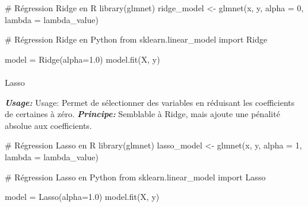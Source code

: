 \documentclass[
  letterpaper,
  DIV=11,
  numbers=noendperiod]{scrartcl}
\makeatletter
\let\oldparagraph\paragraph
\renewcommand{\paragraph}{
    \@ifstar
      \xxxParagraphStar
      \xxxParagraphNoStar
  }
\newcommand{\xxxParagraphStar}[1]{\oldparagraph*{#1}\mbox{}}
\newcommand{\xxxParagraphNoStar}[1]{\oldparagraph{#1}\mbox{}}
\newenvironment{Shaded}{\begin{snugshade}}{\end{snugshade}}
\newcommand{\AttributeTok}[1]{\textcolor[rgb]{0.40,0.45,0.13}{#1}}
\newcommand{\CommentTok}[1]{\textcolor[rgb]{0.37,0.37,0.37}{#1}}
\newcommand{\DecValTok}[1]{\textcolor[rgb]{0.68,0.00,0.00}{#1}}
\newcommand{\FloatTok}[1]{\textcolor[rgb]{0.68,0.00,0.00}{#1}}
\newcommand{\FunctionTok}[1]{\textcolor[rgb]{0.28,0.35,0.67}{#1}}
\newcommand{\NormalTok}[1]{\textcolor[rgb]{0.00,0.23,0.31}{#1}}
\newcommand{\OtherTok}[1]{\textcolor[rgb]{0.00,0.23,0.31}{#1}}
\makeatother
\begin{document}
\begin{Shaded}
\begin{Highlighting}[]
\CommentTok{\# Régression Ridge en R}
\FunctionTok{library}\NormalTok{(glmnet)}
\NormalTok{ridge\_model }\OtherTok{\textless{}{-}} \FunctionTok{glmnet}\NormalTok{(x, y, }\AttributeTok{alpha =} \DecValTok{0}\NormalTok{, }\AttributeTok{lambda =}\NormalTok{ lambda\_value)}
\end{Highlighting}
\end{Shaded}

\begin{Shaded}
\begin{Highlighting}[]
\CommentTok{\# Régression Ridge en Python}
\NormalTok{from sklearn.linear\_model import Ridge}

\NormalTok{model }\OtherTok{=} \FunctionTok{Ridge}\NormalTok{(}\AttributeTok{alpha=}\FloatTok{1.0}\NormalTok{)}
\FunctionTok{model.fit}\NormalTok{(X, y)}
\end{Highlighting}
\end{Shaded}

\paragraph{Lasso}\label{lasso}

\textbf{\emph{Usage:}} Usage: Permet de sélectionner des variables en
réduisant les coefficients de certaines à zéro.
\textbf{\emph{Principe:}} Semblable à Ridge, mais ajoute une pénalité
absolue aux coefficients.

\begin{Shaded}
\begin{Highlighting}[]
\CommentTok{\# Régression Lasso en R}
\FunctionTok{library}\NormalTok{(glmnet)}
\NormalTok{lasso\_model }\OtherTok{\textless{}{-}} \FunctionTok{glmnet}\NormalTok{(x, y, }\AttributeTok{alpha =} \DecValTok{1}\NormalTok{, }\AttributeTok{lambda =}\NormalTok{ lambda\_value)}
\end{Highlighting}
\end{Shaded}

\begin{Shaded}
\begin{Highlighting}[]
\CommentTok{\# Régression Lasso en Python}
\NormalTok{from sklearn.linear\_model import Lasso}

\NormalTok{model }\OtherTok{=} \FunctionTok{Lasso}\NormalTok{(}\AttributeTok{alpha=}\FloatTok{1.0}\NormalTok{)}
\FunctionTok{model.fit}\NormalTok{(X, y)}
\end{Highlighting}
\end{Shaded}
\end{document}
